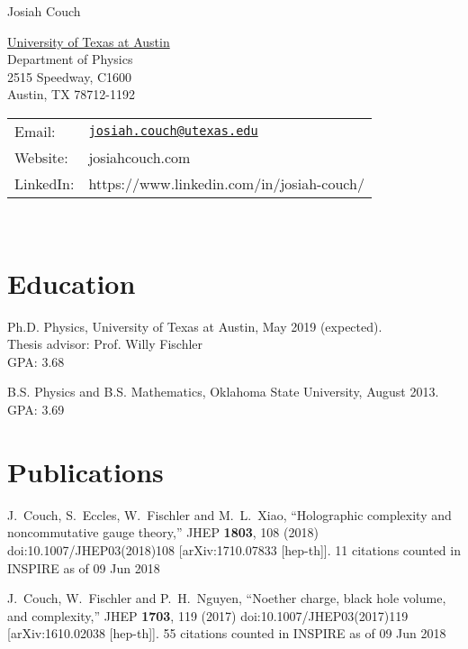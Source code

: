\documentclass[letterpaper]{article}
\def\name{Josiah Couch}
\renewenvironment{itemize}{
  \begin{list}{}{
    \setlength{\leftmargin}{1.5em}
  }
}{
  \end{list}
}
\begin{document}
{\huge \name}


\vspace{0.25in}

\begin{minipage}{0.45\linewidth}
  \href{}{University of Texas at Austin} \\
  Department of Physics \\
  2515 Speedway, C1600 \\
  Austin, TX 78712-1192
\end{minipage}
\begin{minipage}{0.45\linewidth}
  \begin{tabular}{ll}
    Email: & \href{mailto:josiah.couch@utexas.edu}{\tt josiah.couch@utexas.edu} \\
    Website: & josiahcouch.com \\
    LinkedIn: & https://www.linkedin.com/in/josiah-couch/
  \end{tabular}
\end{minipage}
\

\section*{Education}

\begin{itemize}

\item Ph.D. Physics, University of Texas at Austin, May 2019 (expected).\\
  Thesis advisor: Prof. Willy Fischler\\
  GPA: 3.68
  
  
  \item B.S. Physics and B.S. Mathematics, Oklahoma State University, August 2013.\\
  GPA: 3.69

\end{itemize}

\section*{Publications}
\begin{itemize}
  
\item
  J.~Couch, S.~Eccles, W.~Fischler and M.~L.~Xiao,
  ``Holographic complexity and noncommutative gauge theory,''
  JHEP {\bf 1803}, 108 (2018)
  doi:10.1007/JHEP03(2018)108
  [arXiv:1710.07833 [hep-th]].
  11 citations counted in INSPIRE as of 09 Jun 2018

\item  
  J.~Couch, W.~Fischler and P.~H.~Nguyen,
  ``Noether charge, black hole volume, and complexity,''
  JHEP {\bf 1703}, 119 (2017)
  doi:10.1007/JHEP03(2017)119
  [arXiv:1610.02038 [hep-th]].
  55 citations counted in INSPIRE as of 09 Jun 2018

  
\end{itemize}
\end{document}
